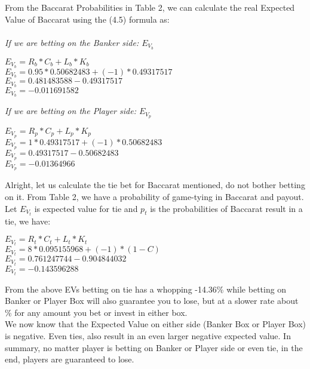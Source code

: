 \documentclass{article}
\begin{document}
From the Baccarat Probabilities in Table 2, we can calculate the real Expected Value of Baccarat using the (4.5) formula as:\\ \\
\emph{If we are betting on the Banker side: $E_{V_b}$}
\begin{center}
$E_{V_b}=R_b*C_b+L_b*K_b$\\ 
$E_{V_b}=0.95*0.50682483+(-1)*0.49317517$\\ 
$E_{V_b}=0.481483588-0.49317517$\\
$E_{V_b}=-0.011691582$\\
\end{center}
\emph{If we are betting on the Player side: $E_{V_p}$}
\begin{center}
$E_{V_p}=R_p*C_p+L_p*K_p$\\ 
$E_{V_p}=1*0.49317517+(-1)*0.50682483$\\ 
$E_{V_p}=0.49317517-0.50682483$\\
$E_{V_p}=-0.01364966$\\
\end{center}

Alright, let us calculate the tie bet for Baccarat mentioned, do not bother betting on it.  From Table 2, we have a probability of game-tying in Baccarat and payout. Let $E_{V_t}$  is expected value for tie and $p_t$ is the probabilities of Baccarat result in a tie, we have:\par
\begin{center}
$E_{V_t}=R_t * C_t + L_t * K_t$\\
$E_{V_t}=8 * 0.095155968 + (-1) * (1-C)$\\
$E_{V_t}=0.761247744 - 0.904844032$\\
$E_{V_t}=-0.143596288$\\
\end{center} 

From the above EVs betting on tie has a whopping -14.36\% while betting on Banker or Player Box will also guarantee you to lose, but at a slower rate about \% for any amount you bet or invest in either box. \\ 

We now know that the Expected Value on either side (Banker Box or Player Box) is negative.  Even ties, also result in an even larger negative expected value. In summary, no matter player is betting on Banker or Player side or even tie, in the end, players are guaranteed to lose.  \\
\end{document}
